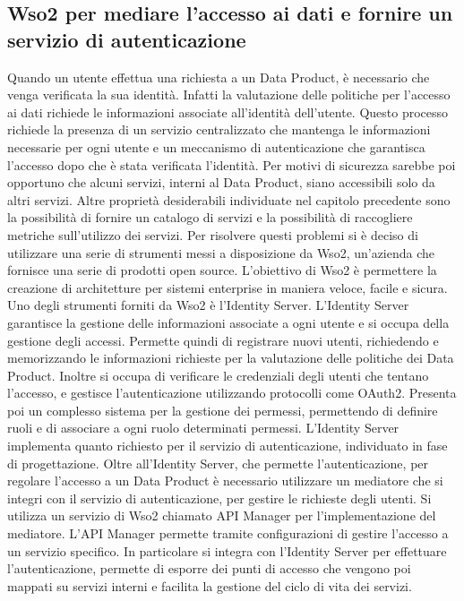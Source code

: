 \documentclass[12pt]{report}
\begin{document}
\subsection{Wso2 per mediare l'accesso ai dati e fornire un servizio di autenticazione}
Quando un utente effettua una richiesta a un Data Product, è necessario che venga verificata la sua identità.
Infatti la valutazione delle politiche per l'accesso ai dati richiede le informazioni associate all'identità dell'utente.
Questo processo richiede la presenza di un servizio centralizzato che mantenga le informazioni necessarie per ogni utente e un meccanismo di autenticazione che garantisca l'accesso dopo che è stata verificata l'identità.
Per motivi di sicurezza sarebbe poi opportuno che alcuni servizi, interni al Data Product, siano accessibili solo da altri servizi.
Altre proprietà desiderabili individuate nel capitolo precedente sono la possibilità di fornire un catalogo di servizi e la possibilità di raccogliere metriche sull'utilizzo dei servizi.
Per risolvere questi problemi si è deciso di utilizzare una serie di strumenti messi a disposizione da Wso2, un'azienda che fornisce una serie di prodotti open source. 
L'obiettivo di Wso2 è permettere la creazione di architetture per sistemi enterprise in maniera veloce, facile e sicura.
Uno degli strumenti forniti da Wso2 è l'Identity Server.
L'Identity Server garantisce la gestione delle informazioni associate a ogni utente e si occupa della gestione degli accessi.
Permette quindi di registrare nuovi utenti, richiedendo e memorizzando le informazioni richieste per la valutazione delle politiche dei Data Product. 
Inoltre si occupa di verificare le credenziali degli utenti  che tentano l'accesso, e gestisce l'autenticazione utilizzando protocolli come OAuth2.
Presenta poi un complesso sistema per la gestione dei permessi, permettendo di definire ruoli e di associare a ogni ruolo determinati permessi.
L'Identity Server implementa quanto richiesto per il servizio di autenticazione, individuato in fase di progettazione.
Oltre all'Identity Server, che permette l'autenticazione, per regolare l'accesso a un Data Product è necessario utilizzare un mediatore che si integri con il servizio di autenticazione, per gestire le richieste degli utenti.
Si utilizza un servizio di Wso2 chiamato API Manager per l'implementazione del mediatore.
L'API Manager permette tramite configurazioni di gestire l'accesso a un servizio specifico.
In particolare si integra con l'Identity Server per effettuare l'autenticazione, permette di esporre dei punti di accesso che vengono poi mappati su servizi interni e facilita la gestione del ciclo di vita dei servizi.
\end{document}
